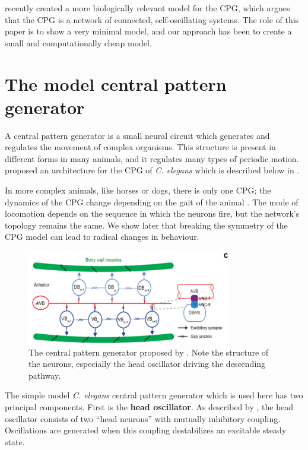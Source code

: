 \documentclass[
    11pt,
]{article}
\begin{document}
\citet{olivares2019} recently created a more biologically relevant model for the CPG, which argues that the CPG is a network of connected, self-oscillating systems.  The role of this paper is to show a very minimal model, and our approach has been to create a small and computationally cheap model.

\section{The model central pattern generator}


A central pattern generator is a small neural circuit which generates and regulates the movement of complex organisms.  This structure is present in different forms in many animals, and it regulates many types of periodic motion.  \citet{xu2018} proposed an architecture for the CPG of \emph{C. elegans} which is described below in .

In more complex animals, like horses or dogs, there is only one CPG; the dynamics of the CPG change depending on the gait of the animal \citep{collins1994}.  The mode of locomotion depends on the sequence in which the neurons fire, but the network's topology remains the same.  We show later that breaking the symmetry of the CPG model can lead to radical changes in behaviour.
\setcounter{figure}{1}
\begin{figure}[h!]
    \ContinuedFloat* 
    \centering
    \includegraphics[width=9cm]{figures/xu_cpg/xu_cpg.png}
    \caption{The central pattern generator proposed by \citet{xu2018}.  Note the structure of the neurons, especially the head oscillator driving the descending pathway.}
    \label{fig: xu_cpg}
\end{figure}

The simple model \emph{C. elegans} central pattern generator which is used here has two principal components.  First is the \textbf{head oscillator}. As described by \citet{gjorgjieva2014}, the head oscillator consists of two “head neurons” with mutually inhibitory coupling. Oscillations are generated when this coupling destabilizes an excitable steady state.
\end{document}
